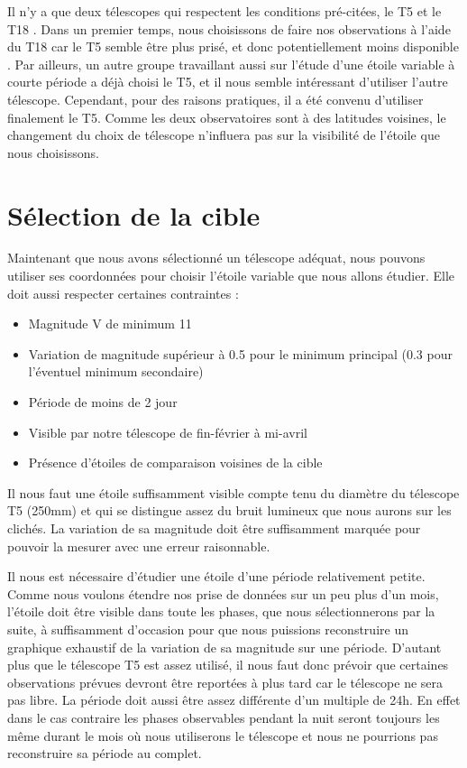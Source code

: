 \documentclass[10pt,french, openany]{book}
\begin{document}
    Il n'y a que deux télescopes qui respectent les conditions pré-citées, le T5 et le T18 \cite{site:T5, site:T18}. Dans un premier temps, nous choisissons de faire nos observations à l'aide du T18 car le T5 semble être plus prisé, et donc potentiellement moins disponible \cite{site:T5}. Par ailleurs, un autre groupe travaillant aussi sur l'étude d'une étoile variable à courte période a déjà choisi le T5, et il nous semble intéressant d'utiliser l'autre télescope. Cependant, pour des raisons pratiques, il a été convenu d'utiliser finalement le T5.  Comme les deux observatoires sont à des latitudes voisines, le changement du choix de télescope n'influera pas sur la visibilité de l'étoile que nous choisissons.
    
\pagebreak
\section{Sélection de la cible}
    Maintenant que nous avons sélectionné un télescope adéquat, nous pouvons utiliser ses coordonnées pour choisir l'étoile variable que nous allons étudier. Elle doit aussi respecter certaines contraintes :
    
    \begin{itemize}
        \item Magnitude V de minimum 11
        \item Variation de magnitude supérieur à 0.5 pour le minimum principal (0.3 pour l'éventuel minimum secondaire)
        \item Période de moins de 2 jour
        \item Visible par notre télescope de fin-février à mi-avril
        \item Présence d'étoiles de comparaison voisines de la cible
    \end{itemize}
    
    Il nous faut une étoile suffisamment visible compte tenu du diamètre du télescope T5 (250mm) et qui se distingue assez du bruit lumineux que nous aurons sur les clichés. La variation de sa magnitude doit être suffisamment marquée pour pouvoir la mesurer avec une erreur raisonnable. 

    Il nous est nécessaire d'étudier une étoile d'une période relativement petite. Comme nous voulons étendre nos prise de données sur un peu plus d'un mois, l'étoile doit être visible dans toute les phases, que nous sélectionnerons par la suite, à suffisamment d'occasion pour que nous puissions reconstruire un graphique exhaustif de la variation de sa magnitude sur une période. D'autant plus que le télescope T5 est assez utilisé, il nous faut donc prévoir que certaines observations prévues devront être reportées à plus tard car le télescope ne sera pas libre. La période doit aussi être assez différente d'un multiple de 24h. En effet dans le cas contraire les phases observables pendant la nuit seront toujours les même durant le mois où nous utiliserons le télescope et nous ne pourrions pas reconstruire sa période au complet.
    
\end{document}

